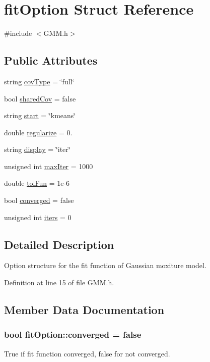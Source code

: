 \hypertarget{structfit_option}{\section{fit\+Option Struct Reference}
\label{structfit_option}
}


{\ttfamily \#include $<$G\+M\+M.\+h$>$}

\subsection*{Public Attributes}
\begin{DoxyCompactItemize}
\item 
string \hyperlink{structfit_option_ae1d880f6fcd26e15f07d50c77c5cceea}{cov\+Type} = \char`\"{}full\char`\"{}
\item 
bool \hyperlink{structfit_option_a2efaf3629539e3864967853058e80420}{shared\+Cov} = false
\item 
string \hyperlink{structfit_option_a4c1ecd5ba984e2e12faa29217c78f931}{start} = \char`\"{}kmeans\char`\"{}
\item 
double \hyperlink{structfit_option_abffa02537679becf07413b31f5889e6f}{regularize} = 0.
\item 
string \hyperlink{structfit_option_acd949efbbb51ddf447d4cb86fd2ac901}{display} = \char`\"{}iter\char`\"{}
\item 
unsigned int \hyperlink{structfit_option_a54d1906ece53c348047c8b404ff06053}{max\+Iter} = 1000
\item 
double \hyperlink{structfit_option_a4523efadc5bc4f29cd1648ac4ca018dd}{tol\+Fun} = 1e-\/6
\item 
bool \hyperlink{structfit_option_a600d82e88e845abb5a442f80eecf89cb}{converged} = false
\item 
unsigned int \hyperlink{structfit_option_a711048d488fccee5740b31e4149c46de}{iters} = 0
\end{DoxyCompactItemize}


\subsection{Detailed Description}
Option structure for the fit function of Gaussian moxiture model. 

Definition at line 15 of file G\+M\+M.\+h.



\subsection{Member Data Documentation}
\hypertarget{structfit_option_a600d82e88e845abb5a442f80eecf89cb}{
\subsubsection[{converged}]{\setlength{\rightskip}{0pt plus 5cm}bool fit\+Option\+::converged = false}}\label{structfit_option_a600d82e88e845abb5a442f80eecf89cb}
True if fit function converged, false for not converged. 

